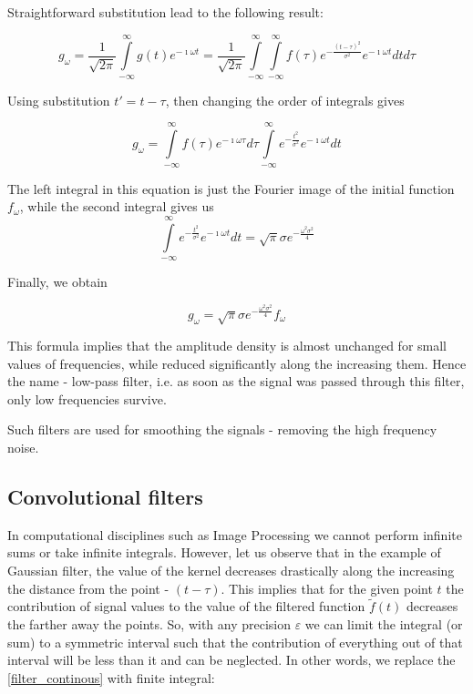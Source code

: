 \documentclass[11pt]{book}
\begin{document}
Straightforward substitution lead to the following result:

\begin{equation}
g_\omega = \frac{1}{\sqrt{2\pi}} \int\limits_{-\infty}^\infty g(t) e^{-\imath\omega t} = \frac{1}{\sqrt{2\pi}} \int\limits_{-\infty}^\infty \int\limits_{-\infty}^\infty f(\tau)e^{-\frac{(t-\tau)^2}{\sigma^2}} e^{-\imath\omega t }dt d\tau 
\end{equation}

Using substitution $t' = t - \tau$, then changing the order of integrals gives

\begin{equation}
g_\omega = \int\limits_{-\infty}^\infty f(\tau) e^{-\imath\omega \tau}d\tau \int\limits_{-\infty}^\infty e^{-\frac {t^2}{\sigma^2}} e^{-\imath\omega t }dt
\end{equation}

The left integral in this equation is just the Fourier image of the initial function $f_\omega$, while the second integral gives us
\begin{equation}
\int\limits_{-\infty}^\infty e^{-\frac {t^2}{\sigma^2}} e^{-\imath\omega t }dt = \sqrt{\pi} \sigma e^{-\frac{\omega^2 \sigma^2}{4}}
\end{equation}

Finally, we obtain

\begin{equation}
g_\omega = \sqrt{\pi} \sigma e^{-\frac{\omega^2 \sigma^2}{4}} f_\omega
\end{equation}

This formula implies that the amplitude density is almost unchanged for small values of frequencies, while reduced significantly along the increasing them. Hence the name - low-pass filter, i.e. as soon as the signal was passed through this filter, only low frequencies survive. 

Such filters are used for smoothing the signals - removing the high frequency noise.

\subsection{Convolutional filters}

In computational disciplines such as Image Processing we cannot perform infinite sums or take infinite integrals. However, let us observe that in the example of Gaussian filter, the value of the kernel decreases drastically along the increasing the distance from the point - $(t-\tau)$. This implies that for the given point $t$ the contribution of signal values to the value of the filtered function $\tilde{f}(t)$ decreases the farther away the points. So, with any precision $\varepsilon$ we can limit the integral (or sum) to a symmetric interval such that the contribution of everything out of that interval will be less than it and can be neglected. In other words, we replace the \eqref{filter_continous}  with finite integral:
\end{document}
